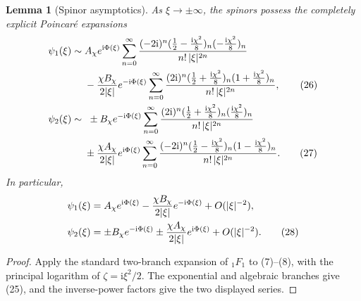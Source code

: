 \documentclass[11pt]{article}
\newtheorem{lemma}{Lemma}
\newcommand{\ii}{\mathrm i}
\begin{document}
\begin{lemma}[Spinor asymptotics]
As \(\xi\to\pm\infty\), the spinors possess the completely explicit Poincar\'e expansions
\begin{align}
 \psi_1(\xi)\sim{}&A_\chi e^{\ii\Phi(\xi)}
 \sum_{n=0}^{\infty}
 \frac{(-2\ii)^n
 (\frac12-\frac{\ii\chi^2}{8})_n
 (-\frac{\ii\chi^2}{8})_n}
 {n!\,|\xi|^{2n}} \notag\\
 &-\frac{\chi B_\chi}{2|\xi|}e^{-\ii\Phi(\xi)}
 \sum_{n=0}^{\infty}
 \frac{(2\ii)^n
 (\frac12+\frac{\ii\chi^2}{8})_n
 (1+\frac{\ii\chi^2}{8})_n}
 {n!\,|\xi|^{2n}}, \tag{26}\\
 \psi_2(\xi)\sim{}&\ \pm B_\chi e^{-\ii\Phi(\xi)}
 \sum_{n=0}^{\infty}
 \frac{(2\ii)^n
 (\frac12+\frac{\ii\chi^2}{8})_n
 (\frac{\ii\chi^2}{8})_n}
 {n!\,|\xi|^{2n}} \notag\\
 &\pm\frac{\chi A_\chi}{2|\xi|}e^{\ii\Phi(\xi)}
 \sum_{n=0}^{\infty}
 \frac{(-2\ii)^n
 (\frac12-\frac{\ii\chi^2}{8})_n
 (1-\frac{\ii\chi^2}{8})_n}
 {n!\,|\xi|^{2n}}. \tag{27}
\end{align}
In particular,
\begin{align}
 \psi_1(\xi)&=A_\chi e^{\ii\Phi(\xi)}
 -\frac{\chi B_\chi}{2|\xi|}e^{-\ii\Phi(\xi)}
 +O(|\xi|^{-2}), \notag\\
 \psi_2(\xi)&=\pm B_\chi e^{-\ii\Phi(\xi)}
 \pm\frac{\chi A_\chi}{2|\xi|}e^{\ii\Phi(\xi)}
 +O(|\xi|^{-2}). \tag{28}
\end{align}
\end{lemma}

\begin{proof}
Apply the standard two-branch expansion of \({}_1F_1\) \cite[Eq.~13.7.2]{DLMF} to (7)--(8), with the principal logarithm of \(\zeta=\ii\xi^2/2\). The exponential and algebraic branches give (25), and the inverse-power factors give the two displayed series.
\end{proof}
\end{document}

